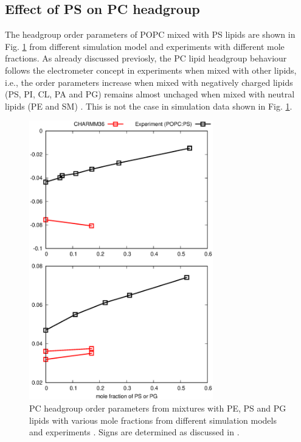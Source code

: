 \documentclass[aps,prl,superscriptaddress,twocolumn]{revtex4}
\begin{document}

\subsection{Effect of PS on PC headgroup}
The headgroup order parameters of POPC 
mixed with PS lipids are shown in Fig. \ref{HGorderparametersPCvsPEPSPG}
from different simulation model and experiments \cite{scherer87} with different
mole fractions. As already discussed previosly, the PC lipid headgroup behaviour
follows the electrometer concept in experiments when mixed with other lipids, i.e., the order
parameters increase when mixed with negatively charged lipids (PS, PI, CL, PA and PG)
remains almost unchaged when mixed with neutral lipids (PE and SM) \cite{scherer87}.
This is not the case in simulation data shown in Fig. \ref{HGorderparametersPCvsPEPSPG}.
\begin{figure}[]
  \centering
  \includegraphics[width=8.0cm]{../Figs/HGorderparametersPCvsPS.eps}
  \caption{\label{HGorderparametersPCvsPEPSPG}
    PC headgroup order parameters from mixtures with PE, PS and PG
    lipids with various mole fractions from different simulation models and experiments \cite{scherer87}.
    Signs are determined as discussed in \cite{botan15,ollila16}.
  }
\end{figure}
\end{document}
